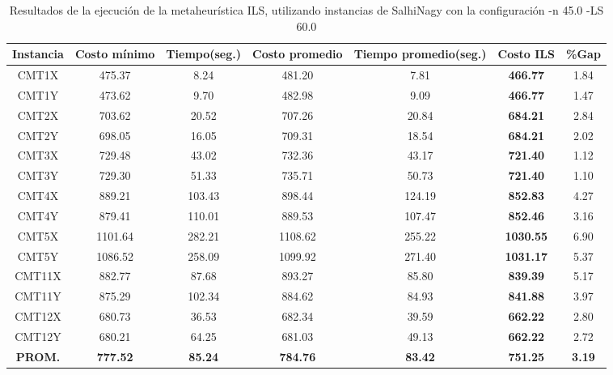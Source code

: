 \begin{table}[ht]
\caption{Resultados de la ejecución de la metaheurística ILS, utilizando instancias de SalhiNagy con la configuración -n 45.0 -LS 60.0}
\centering
\small
\begin{tabular}{c c c c c c c}
\hline\hline
Instancia & Costo mínimo & Tiempo(seg.) & Costo promedio & Tiempo promedio(seg.) & Costo ILS & \%Gap \\ [0.5ex]
\hline
CMT1X & 475.37 & 8.24 & 
481.20 & 7.81 & \bf{466.77} & 
1.84\\CMT1Y & 473.62 & 9.70 & 
482.98 & 9.09 & \bf{466.77} & 
1.47\\CMT2X & 703.62 & 20.52 & 
707.26 & 20.84 & \bf{684.21} & 
2.84\\CMT2Y & 698.05 & 16.05 & 
709.31 & 18.54 & \bf{684.21} & 
2.02\\CMT3X & 729.48 & 43.02 & 
732.36 & 43.17 & \bf{721.40} & 
1.12\\CMT3Y & 729.30 & 51.33 & 
735.71 & 50.73 & \bf{721.40} & 
1.10\\CMT4X & 889.21 & 103.43 & 
898.44 & 124.19 & \bf{852.83} & 
4.27\\CMT4Y & 879.41 & 110.01 & 
889.53 & 107.47 & \bf{852.46} & 
3.16\\CMT5X & 1101.64 & 282.21 & 
1108.62 & 255.22 & \bf{1030.55} & 
6.90\\CMT5Y & 1086.52 & 258.09 & 
1099.92 & 271.40 & \bf{1031.17} & 
5.37\\CMT11X & 882.77 & 87.68 & 
893.27 & 85.80 & \bf{839.39} & 
5.17\\CMT11Y & 875.29 & 102.34 & 
884.62 & 84.93 & \bf{841.88} & 
3.97\\CMT12X & 680.73 & 36.53 & 
682.34 & 39.59 & \bf{662.22} & 
2.80\\CMT12Y & 680.21 & 64.25 & 
681.03 & 49.13 & \bf{662.22} & 
2.72\\\bf{PROM.} & 
\bf{777.52} & \bf{85.24} & \bf{784.76} & \bf{83.42} & \bf{751.25} & \bf{3.19}\\[1ex]\hline
\end{tabular}
\label{table:nonlin}
\end{table} \clearpage
